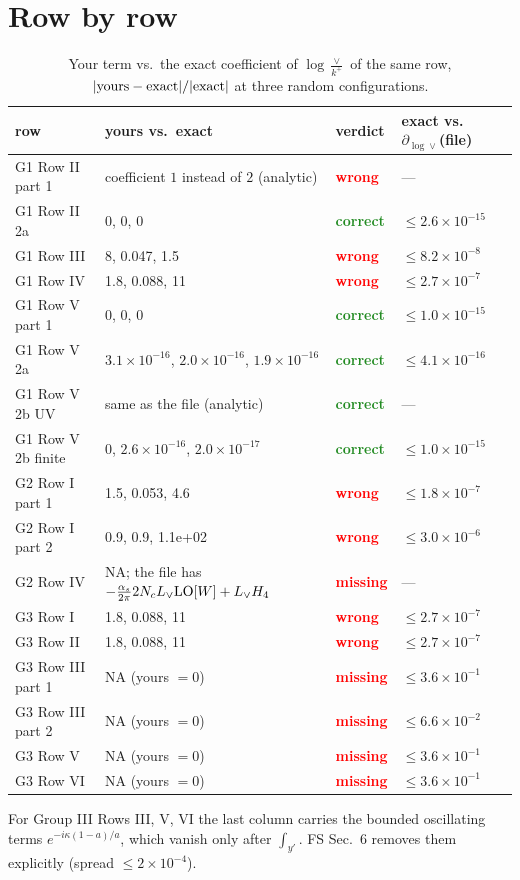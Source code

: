 \documentclass[10pt]{article}
\numberwithin{equation}{section}
\newcommand{\Lv}{L_{\vee}}
\newcommand{\ok}{\textcolor{ForestGreen}{\textbf{correct}}}
\newcommand{\no}{\textcolor{red}{\textbf{wrong}}}
\newcommand{\miss}{\textcolor{red}{\textbf{missing}}}
\begin{document}
\section{Row by row}\label{sec:rows}
\begin{table}[H]\centering\small
\caption{Your term vs.\ the exact coefficient of $\log\frac{\vee}{k^+}$ of the same row, $|{\rm yours}-{\rm exact}|/|{\rm exact}|$ at three random configurations.}\label{tab:rows}
\begin{tabular}{@{}llll@{}}\toprule
row & yours vs.\ exact & verdict & exact vs.\ $\partial_{\log\vee}$(file)\\\midrule
G1 Row II part 1 & coefficient $1$ instead of $2$ (analytic) & \no & --- \\
G1 Row II 2a & $0$, $0$, $0$ & \ok & $\le$$2.6\times10^{-15}$\\
G1 Row III & 8, 0.047, 1.5 & \no & $\le$$8.2\times10^{-8}$\\
G1 Row IV & 1.8, 0.088, 11 & \no & $\le$$2.7\times10^{-7}$\\
G1 Row V part 1 & $0$, $0$, $0$ & \ok & $\le$$1.0\times10^{-15}$\\
G1 Row V 2a & $3.1\times10^{-16}$, $2.0\times10^{-16}$, $1.9\times10^{-16}$ & \ok & $\le$$4.1\times10^{-16}$\\
G1 Row V 2b UV & same as the file (analytic) & \ok & --- \\
G1 Row V 2b finite & $0$, $2.6\times10^{-16}$, $2.0\times10^{-17}$ & \ok & $\le$$1.0\times10^{-15}$\\
G2 Row I part 1 & 1.5, 0.053, 4.6 & \no & $\le$$1.8\times10^{-7}$\\
G2 Row I part 2 & 0.9, 0.9, 1.1e+02 & \no & $\le$$3.0\times10^{-6}$\\
G2 Row IV & NA; the file has $-\frac{\alpha_s}{2\pi}2N_c\Lv{\rm LO}[W]+\Lv H_4$ & \miss & --- \\
G3 Row I & 1.8, 0.088, 11 & \no & $\le$$2.7\times10^{-7}$\\
G3 Row II & 1.8, 0.088, 11 & \no & $\le$$2.7\times10^{-7}$\\
G3 Row III part 1 & NA (yours $=0$) & \miss & $\le$$3.6\times10^{-1}$\\
G3 Row III part 2 & NA (yours $=0$) & \miss & $\le$$6.6\times10^{-2}$\\
G3 Row V & NA (yours $=0$) & \miss & $\le$$3.6\times10^{-1}$\\
G3 Row VI & NA (yours $=0$) & \miss & $\le$$3.6\times10^{-1}$\\
\bottomrule
\end{tabular}
\end{table}
For Group III Rows III, V, VI the last column carries the bounded oscillating terms $e^{-i\kappa(1-a)/a}$, which vanish only after $\int_{y'}$. FS Sec.~6 removes them explicitly (spread $\le2\times10^{-4}$).
\end{document}
